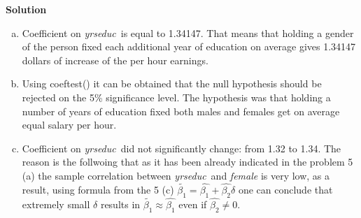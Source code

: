 \documentclass[a4paper]{article}
\newcommand{\yrseduc}{\textit{yrseduc}}
\begin{document}
\textbf{Solution}

\begin{enumerate}[(a)]
	\item Coefficient on \yrseduc\ is equal to 1.34147. That means that holding a gender of the person fixed each additional year of education on average gives 1.34147 dollars of increase of the per hour earnings.
	\item Using coeftest() it can be obtained that the null hypothesis should be rejected on the 5\% significance level. The hypothesis was that holding a number of years of education fixed both males and females get on average equal salary per hour.
	\item Coefficient on \yrseduc\ did not significantly change: from 1.32 to 1.34. The reason is the follwoing that as it has been already indicated in the problem 5 (a) the sample correlation between \yrseduc\ and \textit{female} is very low, as a result, using formula from the 5 (c) $\tilde{\beta_1} = \hat{\beta_1} + \hat{\beta_2} \delta$ one can conclude that extremely small $\delta$ results in $\tilde{\beta_1} \approx \hat{\beta_1}$ even if $\hat{\beta_2} \neq 0$.
\end{enumerate}
\end{document}
